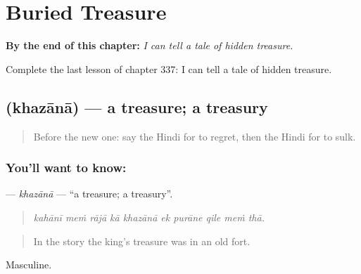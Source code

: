 
\chapter{Buried Treasure}
\label{ch:hi-buried-treasure}

\begin{chapteropening}
\textbf{By the end of this chapter:} \emph{I can tell a tale of hidden treasure.}

Complete the last lesson of chapter 337: I can tell a tale of hidden treasure.
\end{chapteropening}

\section[\texorpdfstring{\hi{ख़ज़ाना} (khazānā)}{ख़ज़ाना (khazānā)}]{ (khazānā) — a treasure; a treasury}

\label{lesson:HI-C337-khazana}



\begin{quote}
Before the new one: say the Hindi for to regret, then the Hindi for to sulk.
\end{quote}

\subsection*{You'll want to know: }
\textbf{} — \emph{khazānā} — \textquotedblleft{}a treasure; a treasury\textquotedblright{}.

\begin{quote}
         
\end{quote}

\begin{quote}
\emph{kahānī meṁ rājā kā khazānā ek purāne qile meṁ thā.}
\end{quote}

\begin{quote}
In the story the king's treasure was in an old fort.
\end{quote}

Masculine.

